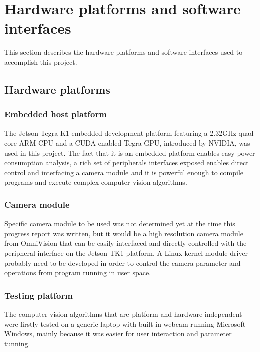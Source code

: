 \chapter{Hardware platforms and software interfaces}

This section describes the hardware platforms and software interfaces used to accomplish this project.

\section{Hardware platforms}

\subsection{Embedded host platform}

The Jetson Tegra K1 embedded development platform \cite{NVIDIA:tk1} featuring a 2.32GHz quad-core ARM CPU and a CUDA-enabled Tegra GPU, introduced by NVIDIA, was used in this project. The fact that it is an embedded platform enables easy power consumption analysis, a rich set of peripherals interfaces exposed enables direct control and interfacing a camera module and it is powerful enough to compile programs and execute complex computer vision algorithms.

\subsection{Camera module}

Specific camera module to be used was not determined yet at the time this progress report was written, but it would be a high resolution camera module from OmniVision \cite{ovt} that can be easily interfaced and directly controlled with the peripheral interface on the Jetson TK1 platform. A Linux kernel module driver probably need to be developed in order to control the camera parameter and operations from program running in user space.

\subsection{Testing platform}

The computer vision algorithms that are platform and hardware independent were firstly tested on a generic laptop with built in webcam running Microsoft Windows, mainly because it was easier for user interaction and parameter tunning.

